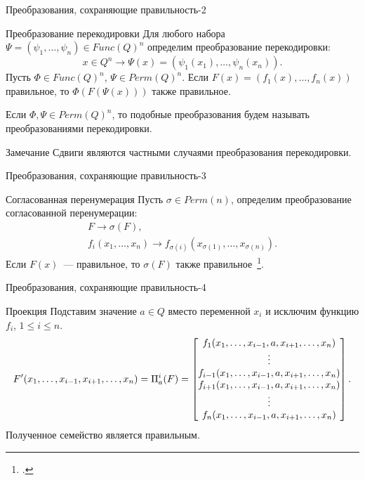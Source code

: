\begin{frame}{Преобразования, сохраняющие правильность-2}
    \begin{mypropos}{Преобразование перекодировки}
        \label{thm:reencoding}
        Для любого набора $\Psi = (\psi_1, \ldots, \psi_n) \in Func(Q)^n$ определим преобразование перекодировки:
        \[
            x \in Q^n \to \Psi(x) = (\psi_1(x_1), \ldots, \psi_n(x_n)).
        \]
        Пусть $\Phi \in Func(Q)^n$, $\Psi \in Perm(Q)^n$.
        Если $F(x) = (f_1(x), \ldots, f_n(x))$ правильное, то $\Phi(F(\Psi(x)))$ также правильное.
    \end{mypropos}
    \pause
    Если $\Phi, \Psi \in Perm(Q)^n$, то подобные преобразования будем называть преобразованиями перекодировки.
    \pause
    \begin{mypropos}{Замечание}
        Сдвиги являются частными случаями преобразования перекодировки.
    \end{mypropos}
\end{frame}


\begin{frame}{Преобразования, сохраняющие правильность-3}
    \begin{mypropos}{Согласованная перенумерация}
        Пусть $\sigma \in Perm(n)$, определим преобразование согласованной перенумерации:
        \begin{gather*}
            F \to \sigma(F), \\
            f_i(x_1, \ldots, x_n) \to 
            f_{\sigma(i)}(x_{\sigma(1)}, \ldots, x_{\sigma(n)}).
        \end{gather*}
        \pause
        Если $F(x)$~--- правильное, то $\sigma(F)$ также правильное~\footcite{nosov08}.
    \end{mypropos}
\end{frame}


\begin{frame}{Преобразования, сохраняющие правильность-4}
    \begin{mypropos}{Проекция}
        Подставим значение $a \in Q$ вместо переменной $x_i$ и исключим функцию $f_i$, $1 \le i \le n$.
        \[
            F'(x_1,\ldots,x_{i-1}, x_{i+1}, \ldots, x_n) = \Pi^i_a(F) =
            \begin{bmatrix}
              f_1(x_1,\ldots,x_{i-1}, a, x_{i+1}, \ldots, x_n) \\
              \vdots \\
              f_{i-1}(x_1,\ldots,x_{i-1}, a, x_{i+1}, \ldots, x_n) \\
              f_{i+1}(x_1,\ldots,x_{i-1}, a, x_{i+1}, \ldots, x_n) \\
              \vdots \\
              f_{n}(x_1,\ldots,x_{i-1}, a, x_{i+1}, \ldots, x_n) \\
            \end{bmatrix}.
        \]
        Полученное семейство является правильным.
    \end{mypropos}
\end{frame}


